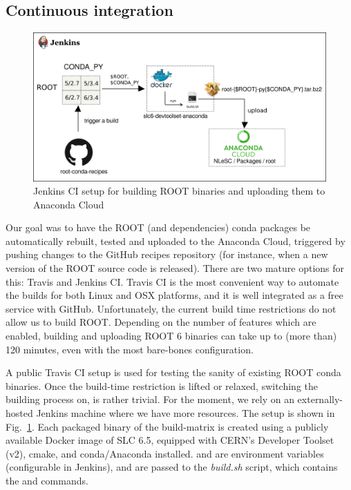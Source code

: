 \documentclass[a4paper]{jpconf}
\begin{document}
\subsection{Continuous integration}
\begin{figure}[!b]
\begin{center}
\includegraphics[width=0.8\linewidth]{./graphics/Jenkinssetup2.png}
\caption{Jenkins CI setup for building ROOT binaries and uploading them to Anaconda Cloud}
\label{fig:jenkins}
\end{center}
\end{figure}
Our goal was to have the ROOT (and dependencies) conda packages be automatically rebuilt, tested and uploaded 
to the Anaconda Cloud, triggered by pushing changes to the GitHub recipes repository (for instance, when a new version of the ROOT source code is released). 
There are two mature options for this: Travis and Jenkins CI. 
Travis CI is the most convenient way to automate the builds for both Linux and 
OSX platforms, and it is well integrated as a free service with GitHub. Unfortunately, the current build time restrictions do not 
allow us to build ROOT. Depending on the number of features which are enabled, building and uploading ROOT 6 binaries
 can take up to (more than) 120 minutes, even with 
the most bare-bones configuration.

A public Travis CI setup is used for testing the sanity of existing ROOT conda binaries. 
Once the build-time restriction is lifted or relaxed, switching the building process on, is rather trivial.
For the moment, we rely on an externally-hosted Jenkins machine where we have more resources.
The setup is shown in Fig.~\ref{fig:jenkins}. 
Each packaged binary of the build-matrix is created using a publicly available Docker image of SLC 6.5, equipped with CERN's Developer Toolset 
(v2), cmake, and conda/Anaconda installed.  and  are environment variables 
(configurable in Jenkins), and are passed to the \textit{build.sh} script, which contains the  and 
commands.
\end{document}
